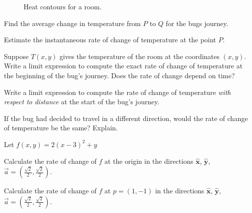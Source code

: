 \documentclass{problemset}
\newcommand{\xh}{{\hat {\mathbf x}}}
\newcommand{\yh}{{\hat {\mathbf y}}}
\begin{document}
\begin{figure}[h!]
\begin{center}
		\end{center}
		\vspace{-.5cm}
		\caption{Heat contours for a room.}
		\label{heatcontour2}
	\end{figure}
	\begin{parts}
		\item Find the average change in temperature from $P$ to $Q$ for the bugs journey.
		\item Estimate the instantaneous rate of change of temperature at the point $P$.
		\item Suppose $T(x,y)$ gives the temperature of the room at the coordinates $(x,y)$.
			Write a limit expression to compute the exact rate of change of temperature
			at the beginning of the bug's journey. Does the rate of change depend on time?
		\item Write a limit expression to compute the rate of change of temperature
			\emph{with respect to distance} at the start of the bug's journey.
		\item If the bug had decided to travel in a different direction, would the rate of change
			of temperature be the same?  Explain.
	\end{parts}
	
	\newpage
	\question
	Let $f(x,y) = 2(x-3)^2+y$
	\begin{parts}
		\item Calculate the rate of change of $f$ at the origin 
			in the directions $\xh$, $\yh$, $\vec a=(\tfrac{\sqrt{2}}{2},\tfrac{\sqrt{2}}{2})$.
		\item Calculate the rate of change of $f$ at $p=(1,-1)$
			in the directions $\xh$, $\yh$, $\vec a=(\tfrac{\sqrt{2}}{2},\tfrac{\sqrt{2}}{2})$.
	\end{parts}
\end{document}
